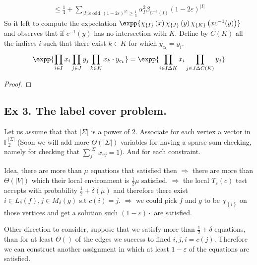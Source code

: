 \documentclass{article}
\newcommand{\Chi}[1]{\chi_{ \left\{ #1  \right\} } }
\begin{document}
\begin{equation*}
  \begin{split}
    \le \frac{1}{4} +  \sum_{|I| \text{is odd}, (1-2\varepsilon)^{|I|} \ge \frac{1}{4} }{\alpha_{I}^{2}\beta_{C^{-1}(I)}  \left( 1 -2 \varepsilon \right)^{|I|}}  
  \end{split}
\end{equation*}
So it left to compute the expectation $ \expp{ \Chi{I}\left( x \right)\Chi{J}\left( y \right) \Chi{K}\left( x c^{-1}(y) \right) }$ and observes that if $c^{-1}(y)$ has no intersection with $K$. Define by $C(K)$ all the indices $i$ such that there exist $ k \in K$ for which $y_{c_{k}} = y_{i}$. 
\begin{equation*}
  \begin{split}
    \expp{\prod_{i \in I}{ x_{i}} \prod_{j \in J}{ y_{j}} \prod_{k \in K }{ x_{k}\cdot y_{c_{k}}} } = \expp{\prod_{i \in I \Delta K }{ x_{i}} \prod_{j \in J \Delta C(K) }{ y_{j}}}
  \end{split}
\end{equation*}
\begin{proof}
\end{proof}


\subsection{Ex 3. The label cover problem.} 
Let us assume that that $|\Sigma|$ is a power of $2$. Associate for each vertex a vector in $\mathbb{F}^{|\Sigma|}_{2}$ (Soon we will add more $\Theta(|\Sigma|)$ variables for having a sparse sum checking, namely for checking that $\sum_{j}^{|\Sigma|}{ x_{vj} }= 1$). And for each constraint. 

Idea, there are more than $\mu  $ equations that satisfied then $\Rightarrow$ there are more than $\Theta\left( |V| \right)$ which their local environment is $\frac{1}{2} \mu$ satisfied. $\Rightarrow$ the local $T_{\varepsilon}(c)$ test accepts with probability $\frac{1}{2}+\delta (\mu)$ and therefore there exist $i \in L_{\delta}(f),j \in M_{\delta}(g)$ s.t $c(i) = j       $. $\Rightarrow$ we could pick $f$ and $g$ to be $\Chi{i}$ on those vertices and get a solution such $\left(1-\varepsilon\right) \cdot  $ are satisfied.    


Other direction to consider, suppose that we satisfy more than $\frac{1}{2} + \delta$ equations, than for at least $\Theta\left(  \right)$ of the edges we success to fined $i,j, i = c(j)$. Therefore we can construct another assignment in which at least $1 - \varepsilon$ of the equations are satisfied.     
\end{document}
